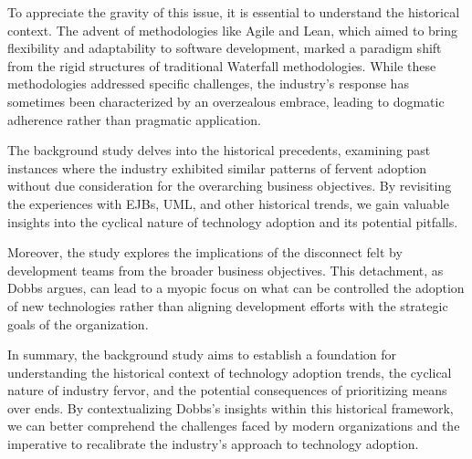 \documentclass[a4Paper]{article}
\begin{document}
To appreciate the gravity of this issue, it is essential to understand the historical context. The advent of methodologies like Agile and Lean, which aimed to bring flexibility and adaptability to software development, marked a paradigm shift from the rigid structures of traditional Waterfall methodologies. While these methodologies addressed specific challenges, the industry's response has sometimes been characterized by an overzealous embrace, leading to dogmatic adherence rather than pragmatic application.

The background study delves into the historical precedents, examining past instances where the industry exhibited similar patterns of fervent adoption without due consideration for the overarching business objectives. By revisiting the experiences with EJBs, UML, and other historical trends, we gain valuable insights into the cyclical nature of technology adoption and its potential pitfalls.

Moreover, the study explores the implications of the disconnect felt by development teams from the broader business objectives. This detachment, as Dobbs argues, can lead to a myopic focus on what can be controlled the adoption of new technologies rather than aligning development efforts with the strategic goals of the organization.

In summary, the background study aims to establish a foundation for understanding the historical context of technology adoption trends, the cyclical nature of industry fervor, and the potential consequences of prioritizing means over ends. By contextualizing Dobbs's insights within this historical framework, we can better comprehend the challenges faced by modern organizations and the imperative to recalibrate the industry's approach to technology adoption.
\pagebreak
\end{document}
